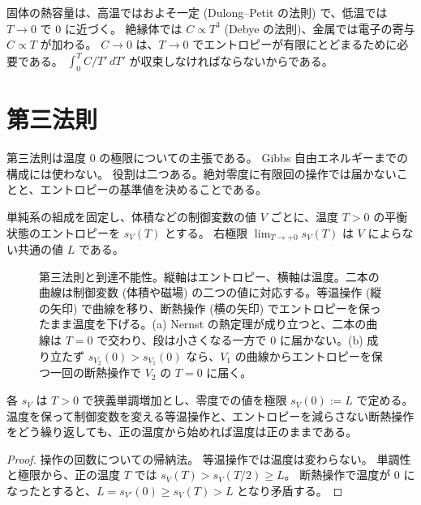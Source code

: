 固体の熱容量は、高温ではおよそ一定 (Dulong--Petit の法則) で、低温では $T \to 0$ で $0$ に近づく。
絶縁体では $C \propto T^3$ (Debye の法則)、金属では電子の寄与 $C \propto T$ が加わる。
$C \to 0$ は、$T \to 0$ でエントロピーが有限にとどまるために必要である。
$\int_0^T C/T'\, dT'$ が収束しなければならないからである。

\section{第三法則}
\label{sec:third-law}

第三法則は温度 $0$ の極限についての主張である。
Gibbs 自由エネルギーまでの構成には使わない。
役割は二つある。絶対零度に有限回の操作では届かないことと、エントロピーの基準値を決めることである。

\begin{empirical}
  \label{emp:nernst}
  \leanok
  単純系の組成を固定し、体積などの制御変数の値 $V$ ごとに、温度 $T > 0$ の平衡状態のエントロピーを $s_V(T)$ とする。
  右極限 $\lim_{T \to +0} s_V(T)$ は $V$ によらない共通の値 $L$ である。
\end{empirical}

\begin{figure}[htbp]
  \centering
  \caption{第三法則と到達不能性。縦軸はエントロピー、横軸は温度。二本の曲線は制御変数 (体積や磁場) の二つの値に対応する。等温操作 (縦の矢印) で曲線を移り、断熱操作 (横の矢印) でエントロピーを保ったまま温度を下げる。(a) Nernst の熱定理が成り立つと、二本の曲線は $T = 0$ で交わり、段は小さくなる一方で $0$ に届かない。(b) 成り立たず $s_{V_2}(0) > s_{V_1}(0)$ なら、$V_1$ の曲線からエントロピーを保つ一回の断熱操作で $V_2$ の $T = 0$ に届く。}
  \label{fig:thirdlaw}
\end{figure}

\begin{theorem}[絶対零度の到達不能性]
  \label{thm:unattainability}
  \leanok
  各 $s_V$ は $T > 0$ で狭義単調増加とし、零度での値を極限 $s_V(0) := L$ で定める。
  温度を保って制御変数を変える等温操作と、エントロピーを減らさない断熱操作をどう繰り返しても、正の温度から始めれば温度は正のままである。
\end{theorem}

\begin{proof}
  \leanok
  操作の回数についての帰納法。
  等温操作では温度は変わらない。
  単調性と極限から、正の温度 $T$ では $s_V(T) > s_V(T/2) \ge L$。
  断熱操作で温度が $0$ になったとすると、$L = s_{V'}(0) \ge s_V(T) > L$ となり矛盾する。
\end{proof}

